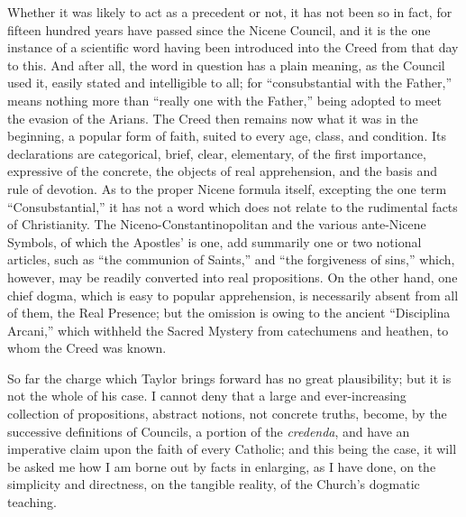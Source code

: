 Whether it was likely to act as a precedent or not, it has not been
so in fact, for fifteen hundred years have passed since the Nicene
Council, and it is the one instance of a scientific word having been
introduced into the Creed from that day to this. And after all, the
word in question has a plain meaning, as the Council used it, easily
stated and intelligible to all; for ``consubstantial with the
Father,'' means nothing more than ``really one with the
Father,'' being adopted to meet the evasion of the Arians. The
Creed then remains now what it was in the beginning, a popular form of
faith, suited to every age, class, and condition. Its declarations are
categorical, brief, clear, elementary, of the first importance,
expressive of the concrete, the objects of real apprehension, and the
basis and rule of devotion. As to the proper Nicene formula itself,
excepting the one term ``Consubstantial,'' it has not a word
which does not relate to the rudimental facts of Christianity. The
Niceno-Constantinopolitan and the various ante-Nicene Symbols, of
which the Apostles' is one, add summarily one or two notional
articles, such as ``the communion of Saints,'' and ``the
forgiveness of sins,'' which, however, may be readily converted
into real propositions. On the other hand, one chief dogma, which is
easy to popular apprehension, is necessarily absent from all of them,
the Real Presence; but the omission is owing to the ancient ``Disciplina
Arcani,'' which withheld the Sacred Mystery from catechumens and
heathen, to whom the Creed was known.

So far the charge which Taylor brings forward has no great
plausibility; but it is not the whole of his case. I cannot deny that
a large and ever-increasing collection of propositions, abstract
notions, not concrete truths, become, by the successive definitions of
Councils, a portion of the \emph{credenda}, and have an imperative
claim upon the faith of every Catholic; and this being the case, it
will be asked me how I am borne out by facts in enlarging, as I have
done, on the simplicity and directness, on the tangible reality, of
the Church's dogmatic teaching.


